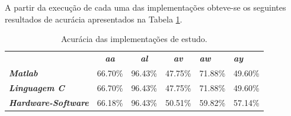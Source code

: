 A partir da execução de cada uma das implementações obteve-se os seguintes resultados de acurácia apresentados na Tabela \ref{acuracias}. 
\begin{table}[!h]
	\label{acuracias}
	\caption{Acurácia das implementações de estudo.}
	\centering
	\begin{tabular}{lccccc}
		\rowcolor[HTML]{DAE8FC} 
		\multicolumn{1}{c}{\cellcolor[HTML]{DAE8FC}\textbf{Implementação}} & \textit{\textbf{aa}} & \textit{\textbf{al}} & \textit{\textbf{av}} & \multicolumn{1}{l}{\cellcolor[HTML]{DAE8FC}\textit{\textbf{aw}}} & \multicolumn{1}{l}{\cellcolor[HTML]{DAE8FC}\textit{\textbf{ay}}} \\
		\textit{\textbf{Matlab}}                                        & 66.70\%              & 96.43\%              & 47.75\%              & 71.88\%                                                          & 49.60\%                                                          \\
		\rowcolor[HTML]{DAE8FC} 
		\textit{\textbf{Linguagem C}}                                   & 66.70\%              & 96.43\%              & 47.75\%              & 71.88\%                                                          & 49.60\%                                                          \\
		\textit{\textbf{Hardware-Software}}                             & 66.18\%              & 96.43\%              & 50.51\%              & 59.82\%                                                          & 57.14\%                                                         
	\end{tabular}
\end{table}






